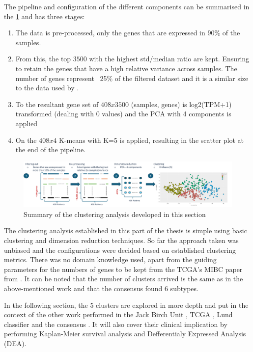 The pipeline and configuration of the different components can be summarised in the \cref{fig:cs:clustering_pipeline} and has three stages:
\begin{enumerate}
    \item The data is pre-processed, only the genes that are expressed in 90\% of the samples. \item From this, the top $3500$ with the highest std/median ratio are kept. Ensuring to retain the genes that have a high relative variance across samples. The number of genes represent ~25\% of the filtered dataset and it is a similar size to the data used by \citet{Robertson2017-mg}.
    \item To the resultant gene set of $408x3500$ (samples, genes) is log2(TPM+1) transformed (dealing with 0 values) and the PCA with 4 components is applied
    \item On the $408x4$ K-means with K=5 is applied, resulting in the scatter plot at the end of the pipeline.
\end{enumerate}

\begin{figure}[!htb]    
    \centering
    \includegraphics[width=1\textwidth,keepaspectratio]{Sections/ClusteringAnalysis/Resources/clustering_pipeline.png}
    \caption{Summary of the clustering analysis developed in this section}
    \label{fig:cs:clustering_pipeline}
\end{figure}

The clustering analysis established in this part of the thesis is simple using basic clustering and dimension reduction techniques. So far the approach taken was unbiased and the configurations were decided based on established clustering metrics. There was no domain knowledge used, apart from the guiding parameters for the numbers of genes to be kept from the TCGA's MIBC paper from \citet{Robertson2017-mg}. It can be noted that the number of clusters arrived is the same as in the above-mentioned work and that the consensus \citet{Kamoun2020-tj} found 6 subtypes. 

In the following section, the 5 clusters are explored in more depth and put in the context of the other work performed in the Jack Birch Unit \citet{Baker2022-bj}, TCGA \citet{Robertson2017-mg}, Lund classifier \citet{Marzouka2018-ge} and the consensus \citet{Kamoun2020-tj}. It will also cover their clinical implication by performing Kaplan-Meier survival analysis and Defferentialy Expressed Analysis (DEA).



